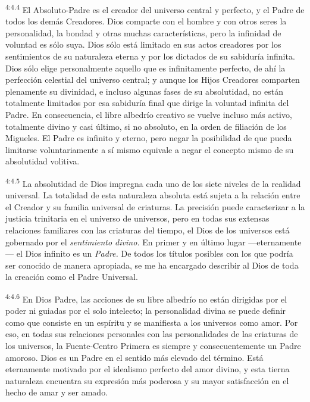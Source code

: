 \par
\textsuperscript{4:4.4} El Absoluto-Padre es el creador del universo central y perfecto, y el Padre de todos los demás Creadores. Dios comparte con el hombre y con otros seres la personalidad, la bondad y otras muchas características, pero la infinidad de voluntad es sólo suya. Dios sólo está limitado en sus actos creadores por los sentimientos de su naturaleza eterna y por los dictados de su sabiduría infinita. Dios sólo elige personalmente aquello que es infinitamente perfecto, de ahí la perfección celestial del universo central; y aunque los Hijos Creadores comparten plenamente su divinidad, e incluso algunas fases de su absolutidad, no están totalmente limitados por esa sabiduría final que dirige la voluntad infinita del Padre. En consecuencia, el libre albedrío creativo se vuelve incluso más activo, totalmente divino y casi último, si no absoluto, en la orden de filiación de los Migueles. El Padre es infinito y eterno, pero negar la posibilidad de que pueda limitarse voluntariamente a sí mismo equivale a negar el concepto mismo de su absolutidad volitiva.

\par
\textsuperscript{4:4.5} La absolutidad de Dios impregna cada uno de los siete niveles de la realidad universal. La totalidad de esta naturaleza absoluta está sujeta a la relación entre el Creador y su familia universal de criaturas. La precisión puede caracterizar a la justicia trinitaria en el universo de universos, pero en todas sus extensas relaciones familiares con las criaturas del tiempo, el Dios de los universos está gobernado por el \textit{sentimiento divino.} En primer y en último lugar ---eternamente--- el Dios infinito es un \textit{Padre.} De todos los títulos posibles con los que podría ser conocido de manera apropiada, se me ha encargado describir al Dios de toda la creación como el Padre Universal.

\par
\textsuperscript{4:4.6} En Dios Padre, las acciones de su libre albedrío no están dirigidas por el poder ni guiadas por el solo intelecto; la personalidad divina se puede definir como que consiste en un espíritu y se manifiesta a los universos como amor. Por eso, en todas sus relaciones personales con las personalidades de las criaturas de los universos, la Fuente-Centro Primera es siempre y consecuentemente un Padre amoroso. Dios es un Padre en el sentido más elevado del término. Está eternamente motivado por el idealismo perfecto del amor divino, y esta tierna naturaleza encuentra su expresión más poderosa y su mayor satisfacción en el hecho de amar y ser amado.

